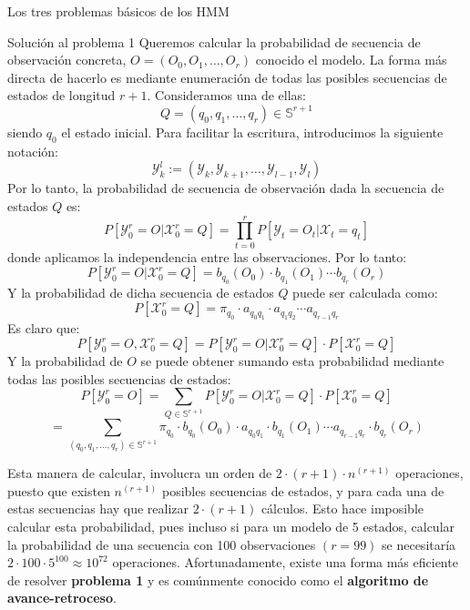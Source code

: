 \begin{section}{Los tres problemas básicos de los HMM}
\begin{subsection}{Solución al problema 1}
Queremos calcular la probabilidad de secuencia de observación concreta, $O=(O_0,O_1,\dots, O_r)$ conocido el modelo. La forma más directa de hacerlo es mediante enumeración de todas las posibles secuencias de estados de longitud $r+1$. Consideramos una de ellas:
\[Q=(q_0 , q_1 , \dots , q_r)\in\mathbb{S}^{r+1}\]
siendo $q_0$ el estado inicial. Para facilitar la escritura, introducimos la siguiente notación:
\[\mathcal{Y}_k^l:=(\mathcal{Y}_{k},\mathcal{Y}_{k+1},\dots,\mathcal{Y}_{l-1},\mathcal{Y}_{l})\]
Por lo tanto, la probabilidad de secuencia de observación dada la secuencia de estados $Q$ es:
\[P[\mathcal{Y}_0^r=O|\mathcal{X}_0^r=Q]=\prod_{t=0}^r P[\mathcal{Y}_{t}=O_t|\mathcal{X}_{t}=q_t]\]
donde aplicamos la independencia entre las observaciones. Por lo tanto:
\[P[\mathcal{Y}_0^r=O|\mathcal{X}_0^r=Q]=b_{q_0}(O_0)\cdot b_{q_1}(O_1)\cdots b_{q_r}(O_r)\]
Y la probabilidad de dicha secuencia de estados $Q$ puede ser calculada como:
\[P[\mathcal{X}_0^r=Q]=\pi_{q_0}\cdot a_{q_0q_1}\cdot a_{q_1q_2}\cdots a_{q_{r-1}q_r} \]
Es claro que:
\[P[\mathcal{Y}_0^r=O,\mathcal{X}_0^r=Q]=P[\mathcal{Y}_0^r=O|\mathcal{X}_0^r=Q]\cdot P[\mathcal{X}_0^r=Q] \]
Y la probabilidad de $O$ se puede obtener sumando esta probabilidad mediante todas las posibles secuencias de estados:
\[P[\mathcal{Y}_0^r=O]=\sum_{Q\in\mathbb{S}^{r+1}}P[\mathcal{Y}_0^r=O|\mathcal{X}_0^r=Q]\cdot P[\mathcal{X}_0^r=Q]\]
\[=\sum_{(q_0 , q_1 , \dots , q_r)\in\mathbb{S}^{r+1}}\pi_{q_0}\cdot b_{q_0}(O_0)\cdot a_{q_0q_1}\cdot b_{q_1}(O_1)\cdots a_{q_{r-1}q_r}\cdot b_{q_r}(O_r)\]

Esta manera de calcular, involucra un orden de $2\cdot(r+1)\cdot n^{(r+1)}$ operaciones, puesto que existen $n^{(r+1)}$ posibles secuencias de estados, y para cada una de estas secuencias hay que realizar $2\cdot(r+1)$ cálculos. Esto hace imposible calcular esta probabilidad, pues incluso si para un modelo de 5 estados, calcular la probabilidad de una secuencia con 100 observaciones $(r=99)$ se necesitaría $2\cdot100\cdot5^{100}\approx10^{72}$ operaciones. Afortunadamente, existe una forma más eficiente de resolver \textbf{problema 1} y es comúnmente conocido como el \textbf{algoritmo de avance-retroceso}. 


\end{subsection}
\end{section}
